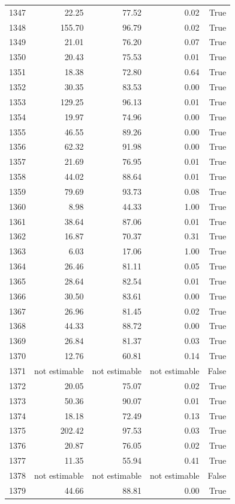 \begin{longtable}{rrrrr}
1347 & 22.25 & 77.52 & 0.02 & True \\
1348 & 155.70 & 96.79 & 0.02 & True \\
1349 & 21.01 & 76.20 & 0.07 & True \\
1350 & 20.43 & 75.53 & 0.01 & True \\
1351 & 18.38 & 72.80 & 0.64 & True \\
1352 & 30.35 & 83.53 & 0.00 & True \\
1353 & 129.25 & 96.13 & 0.01 & True \\
1354 & 19.97 & 74.96 & 0.00 & True \\
1355 & 46.55 & 89.26 & 0.00 & True \\
1356 & 62.32 & 91.98 & 0.00 & True \\
1357 & 21.69 & 76.95 & 0.01 & True \\
1358 & 44.02 & 88.64 & 0.01 & True \\
1359 & 79.69 & 93.73 & 0.08 & True \\
1360 & 8.98 & 44.33 & 1.00 & True \\
1361 & 38.64 & 87.06 & 0.01 & True \\
1362 & 16.87 & 70.37 & 0.31 & True \\
1363 & 6.03 & 17.06 & 1.00 & True \\
1364 & 26.46 & 81.11 & 0.05 & True \\
1365 & 28.64 & 82.54 & 0.01 & True \\
1366 & 30.50 & 83.61 & 0.00 & True \\
1367 & 26.96 & 81.45 & 0.02 & True \\
1368 & 44.33 & 88.72 & 0.00 & True \\
1369 & 26.84 & 81.37 & 0.03 & True \\
1370 & 12.76 & 60.81 & 0.14 & True \\
1371 & not estimable & not estimable & not estimable & False \\
1372 & 20.05 & 75.07 & 0.02 & True \\
1373 & 50.36 & 90.07 & 0.01 & True \\
1374 & 18.18 & 72.49 & 0.13 & True \\
1375 & 202.42 & 97.53 & 0.03 & True \\
1376 & 20.87 & 76.05 & 0.02 & True \\
1377 & 11.35 & 55.94 & 0.41 & True \\
1378 & not estimable & not estimable & not estimable & False \\
1379 & 44.66 & 88.81 & 0.00 & True \\

\end{longtable}
